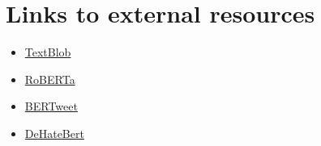 \documentclass[11pt]{article}
\begin{document}
\section{Links to external resources}
\label{sec:links}
\explanation{
}


\begin{itemize}
    \item \href{https://textblob.readthedocs.io/en/dev/quickstart.html}{TextBlob}
    \item \href{https://huggingface.co/cardiffnlp/twitter-roberta-base-hate}{RoBERTa}
    \item \href{https://huggingface.co/tum-nlp/bertweet-sexism}{BERTweet}
    \item \href{https://huggingface.co/Hate-speech-CNERG/dehatebert-mono-spanish}{DeHateBert}
\end{itemize}







\end{document}
